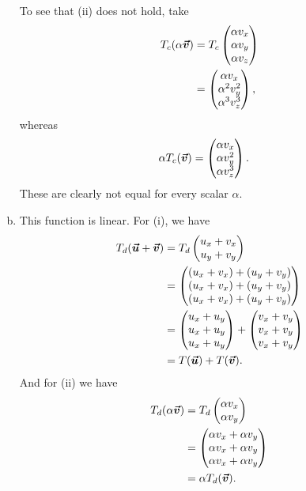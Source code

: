\documentclass[12pt]{article} %
\begin{document}
\begin{solution}
\begin{enumerate}[(a)]
    To see that (ii) does not hold, take 
    \begin{align*}
        T_c(\alpha \boldsymbol{\vec{v}} ) &= T_c\begin{pmatrix} \alpha v_x \\ \alpha v_y \\ \alpha v_z \end{pmatrix}\\
        &= \begin{pmatrix} \alpha v_x \\ \alpha^2 v_y^2 \\ \alpha^3 v_z^3\end{pmatrix},
    \end{align*}
    whereas
    \begin{align*}
        \alpha T_c(\boldsymbol{\vec{v}})&= \begin{pmatrix} \alpha v_x \\ \alpha v_y^2 \\ \alpha v_z^3\end{pmatrix}.
    \end{align*}
    These are clearly not equal for every scalar $\alpha$.
    \item This function is linear. For (i), we have
    \begin{align*}
        T_d(\boldsymbol{\vec{u}} + \boldsymbol{\vec{v}}) &= T_d \begin{pmatrix} u_x + v_x \\ u_y + v_y \end{pmatrix}\\
        &=\begin{pmatrix} (u_x+v_x)+(u_y+v_y) \\ (u_x+v_x)+(u_y+v_y) \\ (u_x+v_x) + (u_y +v_y) \end{pmatrix}\\
        &= \begin{pmatrix} u_x + u_y \\ u_x + u_y \\ u_x + u_y \end{pmatrix} + \begin{pmatrix} v_x + v_y \\ v_x + v_y \\ v_x + v_y \end{pmatrix}\\
        &= T(\boldsymbol{\vec{u}}) + T(\boldsymbol{\vec{v}}).
    \end{align*}
    And for (ii) we have
    \begin{align*}
        T_d(\alpha \boldsymbol{\vec{v}}) &= T_d \begin{pmatrix} \alpha v_x \\ \alpha v_y \end{pmatrix}\\
        &= \begin{pmatrix} \alpha v_x + \alpha v_y \\ \alpha v_x + \alpha v_y \\ \alpha v_x + \alpha v_y \end{pmatrix}\\
        &= \alpha T_d(\boldsymbol{\vec{v}}).
    \end{align*}
\end{enumerate}
\end{solution}
\end{document}
